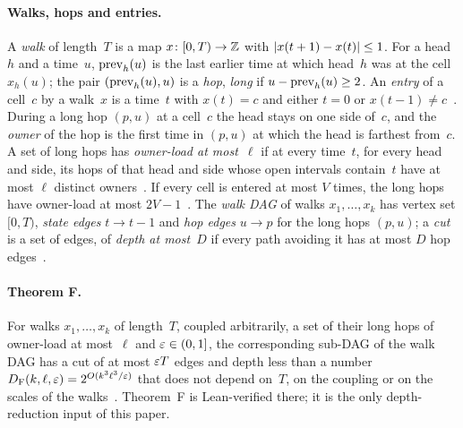 \paragraph{Walks, hops and entries.} A \emph{walk} of length~$T$ is a map $x\colon[0,T)\to\mathbb{Z}$ with
$\lvert x(t+1)-x(t) \rvert\le1$. For a head~$h$ and a time~$u$, $\mathrm{prev}_h(u)$ is the last earlier time at which head~$h$ was at
the cell $x_h(u)$; the pair $(\mathrm{prev}_h(u),u)$ is a \emph{hop}, \emph{long} if $u-\mathrm{prev}_h(u)\ge2$. An \emph{entry} of a
cell~$c$ by a walk~$x$ is a time~$t$ with $x(t)=c$ and either $t=0$ or
$x(t-1)\ne c$~\cite[Definition~2.1]{BoundedNesting2026}. During a long hop $(p,u)$ at a cell~$c$ the head stays on one
side of~$c$, and the \emph{owner} of the hop is the first time in $(p,u)$ at which the head is farthest from~$c$. A set of
long hops has \emph{owner-load at most~$\ell$} if at every time~$t$, for every head and side, its hops of that head and
side whose open intervals contain~$t$ have at most $\ell$ distinct
owners~\cite[Definition~2.2]{BoundedNesting2026}. If every cell is entered at most $V$ times, the long hops have
owner-load at most $2V-1$~\cite[Corollary~3.2]{BoundedNesting2026}. The \emph{walk DAG} of walks $x_1,\dots,x_k$ has
vertex set $[0,T)$, \emph{state edges} $t\to t-1$ and \emph{hop edges} $u\to p$ for the long hops $(p,u)$; a \emph{cut}
is a set of edges, of \emph{depth at most~$D$} if every path avoiding it has at most $D$ hop
edges~\cite[Section~2.3]{BoundedNesting2026}.

\paragraph{Theorem F.} For walks $x_1,\dots,x_k$ of length~$T$, coupled arbitrarily, a set of their long hops of
owner-load at most~$\ell$ and $\varepsilon\in(0,1]$, the corresponding sub-DAG of the walk DAG has a cut of at most $\varepsilon T$
edges and depth less than a number $D_{\mathrm F}(k,\ell,\varepsilon)=2^{O(k^3\ell^3/\varepsilon)}$ that does not depend on~$T$, on the coupling
or on the scales of the walks~\cite[Theorem~3.6]{BoundedNesting2026}. Theorem~F is Lean-verified there; it is the only
depth-reduction input of this paper.

